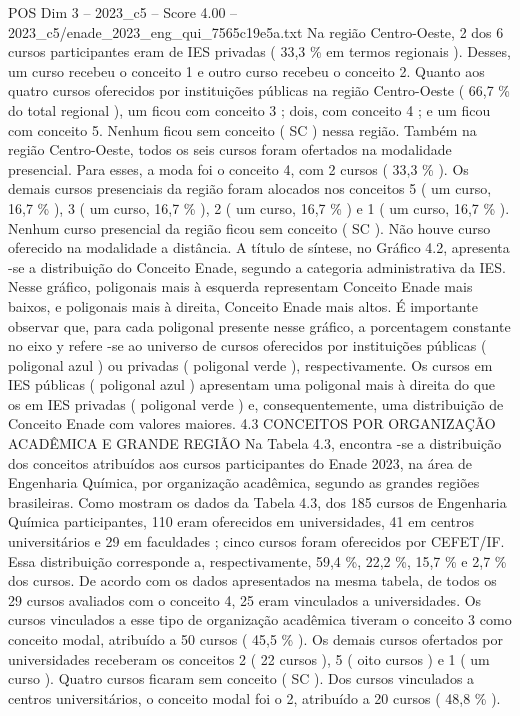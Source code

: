 \begin{textsample}{POS Dim 3 – 2023\_c5 – Score 4.00 – 2023\_c5/enade\_2023\_eng\_qui\_7565c19e5a.txt}
Na região Centro-Oeste, 2 dos 6 cursos participantes eram de IES privadas ( 33,3 \% em termos regionais ).
Desses, um curso recebeu o conceito 1 e outro curso recebeu o conceito 2.
Quanto aos quatro cursos oferecidos por instituições públicas na região Centro-Oeste ( 66,7 \% do total regional ), um ficou com conceito 3 ; dois, com conceito 4 ; e um ficou com conceito 5.
Nenhum ficou sem conceito ( SC ) nessa região.
Também na região Centro-Oeste, todos os seis cursos foram ofertados na modalidade presencial.
Para esses, a moda foi o conceito 4, com 2 cursos ( 33,3 \% ).
Os demais cursos presenciais da região foram alocados nos conceitos 5 ( um curso, 16,7 \% ), 3 ( um curso, 16,7 \% ), 2 ( um curso, 16,7 \% ) e 1 ( um curso, 16,7 \% ).
Nenhum curso presencial da região ficou sem conceito ( SC ).
Não houve curso oferecido na modalidade a distância.
A título de síntese, no Gráfico 4.2, apresenta -se a distribuição do Conceito Enade, segundo a categoria administrativa da IES.
Nesse gráfico, poligonais mais à esquerda representam Conceito Enade mais baixos, e poligonais mais à direita, Conceito Enade mais altos.
É importante observar que, para cada poligonal presente nesse gráfico, a porcentagem constante no eixo y refere -se ao universo de cursos oferecidos por instituições públicas ( poligonal azul ) ou privadas ( poligonal verde ), respectivamente.
Os cursos em IES públicas ( poligonal azul ) apresentam uma poligonal mais à direita do que os em IES privadas ( poligonal verde ) e, consequentemente, uma distribuição de Conceito Enade com valores maiores. 4.3 CONCEITOS POR ORGANIZAÇÃO ACADÊMICA E GRANDE REGIÃO Na Tabela 4.3, encontra -se a distribuição dos conceitos atribuídos aos cursos participantes do Enade 2023, na área de Engenharia Química, por organização acadêmica, segundo as grandes regiões brasileiras.
Como mostram os dados da Tabela 4.3, dos 185 cursos de Engenharia Química participantes, 110 eram oferecidos em universidades, 41 em centros universitários e 29 em faculdades ; cinco cursos foram oferecidos por CEFET/IF.
Essa distribuição corresponde a, respectivamente, 59,4 \%, 22,2 \%, 15,7 \% e 2,7 \% dos cursos.
De acordo com os dados apresentados na mesma tabela, de todos os 29 cursos avaliados com o conceito 4, 25 eram vinculados a universidades.
Os cursos vinculados a esse tipo de organização acadêmica tiveram o conceito 3 como conceito modal, atribuído a 50 cursos ( 45,5 \% ).
Os demais cursos ofertados por universidades receberam os conceitos 2 ( 22 cursos ), 5 ( oito cursos ) e 1 ( um curso ).
Quatro cursos ficaram sem conceito ( SC ).
Dos cursos vinculados a centros universitários, o conceito modal foi o 2, atribuído a 20 cursos ( 48,8 \% ).

\end{textsample}
